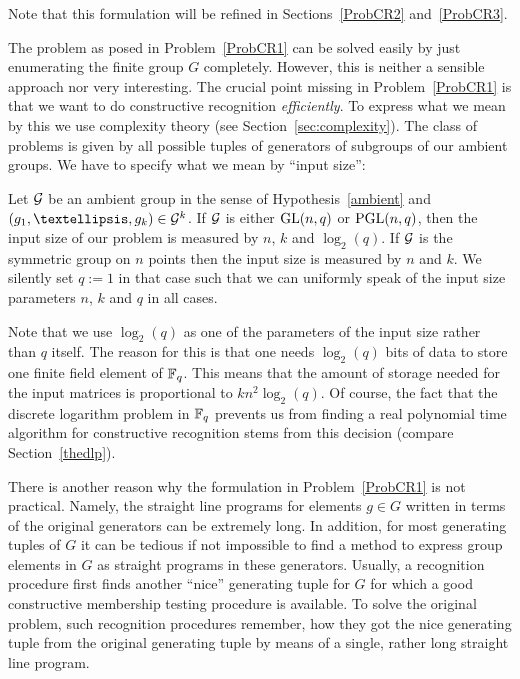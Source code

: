 Note that this formulation will be refined in Sections~\ref{ProbCR2} 
and~\ref{ProbCR3}.

\smallskip
The problem as posed in Problem~\ref{ProbCR1} can be solved easily by just
enumerating the finite group $G$ completely. However, this is neither
a sensible approach nor very interesting. The crucial point missing
in Problem~\ref{ProbCR1} is that we want to do constructive recognition
\emph{efficiently}. To express what we mean by this we use complexity
theory (see Section~\ref{sec:complexity}). 
The class of problems is given by all possible tuples of
generators of subgroups of our ambient groups. We have to specify
what we mean by ``input size'':

\begin{Def}
\label{inputsize}
Let $\mathcal{G}$ be an ambient group in the sense of Hypothesis~\ref{ambient}
and $(g_1, \ldots, g_k) \in \GG^k$. If $\mathcal{G}$ is either $\GL(n,q)$ or
$\PGL(n,q)$, then the input size of our problem is measured by $n$, $k$
and $\log_2(q)$. If $\mathcal{G}$ is the symmetric group on $n$ points then the
input size is measured by $n$ and $k$. We silently set $q := 1$ in that
case such that we can uniformly speak of the input size parameters $n$, $k$
and $q$ in all cases.
\end{Def}

\begin{Rem}
Note that we use $\log_2(q)$ as one of the parameters of the input size
rather than $q$ itself. The reason for this is that one needs
$\log_2(q)$ bits of data to store one finite field element of $\mathbb{F}_q$.
This means that the amount of storage needed for the input matrices is
proportional to $kn^2\log_2(q)$. Of course, the fact that the discrete
logarithm problem in $\mathbb{F}_q$ prevents us from finding a real polynomial
time algorithm for constructive recognition stems from this decision
(compare Section~\ref{thedlp}).
\proofend
\end{Rem}

There is another reason why the formulation in Problem~\ref{ProbCR1} is not
practical. Namely, the straight line programs for elements $g \in G$
written in terms of the original generators can be extremely long. In
addition, for most generating tuples of $G$ it can be tedious if not
impossible to find a method to express group elements in $G$ as straight
programs in these generators. Usually, a recognition procedure first finds
another ``nice'' generating tuple for $G$ for which a good constructive
membership testing procedure is available. To solve the original problem,
such recognition procedures remember, how they got the nice generating
tuple from the original generating tuple by means of a single, rather long
straight line program.


